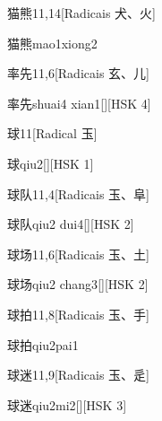 \begin{entry}{猫熊}{11,14}[Radicais ⽝、⽕]
  \begin{phonetics}{猫熊}{mao1xiong2}
  \end{phonetics}
\end{entry}

\begin{entry}{率先}{11,6}[Radicais ⽞、⼉]
  \begin{phonetics}{率先}{shuai4 xian1}[][HSK 4]
  \end{phonetics}
\end{entry}

\begin{entry}{球}{11}[Radical ⽟]
  \begin{phonetics}{球}{qiu2}[][HSK 1]
  \end{phonetics}
\end{entry}

\begin{entry}{球队}{11,4}[Radicais ⽟、⾩]
  \begin{phonetics}{球队}{qiu2 dui4}[][HSK 2]
  \end{phonetics}
\end{entry}

\begin{entry}{球场}{11,6}[Radicais ⽟、⼟]
  \begin{phonetics}{球场}{qiu2 chang3}[][HSK 2]
  \end{phonetics}
\end{entry}

\begin{entry}{球拍}{11,8}[Radicais ⽟、⼿]
  \begin{phonetics}{球拍}{qiu2pai1}
  \end{phonetics}
\end{entry}

\begin{entry}{球迷}{11,9}[Radicais ⽟、⾡]
  \begin{phonetics}{球迷}{qiu2mi2}[][HSK 3]
  \end{phonetics}
\end{entry}

